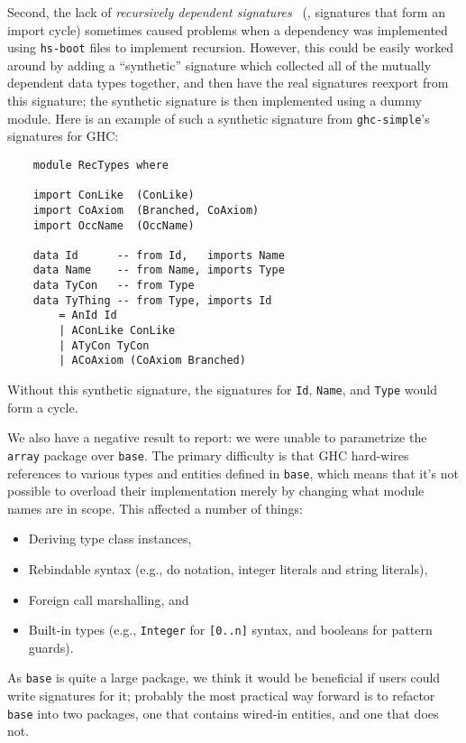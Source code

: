 Second, the lack of
\emph{recursively dependent signatures}~\cite{crary+:recmod-pldi}
(\ie, signatures that form an import cycle)
sometimes caused problems when a
dependency was implemented using \texttt{hs-boot} files to implement
recursion.  However, this could be easily worked around by adding
a ``synthetic'' signature which collected all of the mutually dependent
data types together, and then have the real signatures reexport
from this signature;  the synthetic signature is then implemented using
a dummy module.  Here is an example of such a synthetic signature
from \texttt{ghc-simple}'s signatures for GHC\@:

\begin{verbatim}
    module RecTypes where

    import ConLike  (ConLike)
    import CoAxiom  (Branched, CoAxiom)
    import OccName  (OccName)

    data Id      -- from Id,   imports Name
    data Name    -- from Name, imports Type
    data TyCon   -- from Type
    data TyThing -- from Type, imports Id
        = AnId Id
        | AConLike ConLike
        | ATyCon TyCon
        | ACoAxiom (CoAxiom Branched)
\end{verbatim}
Without this synthetic signature, the signatures for \texttt{Id}, \texttt{Name},
and \texttt{Type} would form a cycle.

We also have a negative result to report: we were unable to parametrize
the \verb|array| package over \verb|base|.  The primary difficulty is
that GHC hard-wires references to various types and entities defined in
\verb|base|, which means that it's not possible to overload their
implementation merely by changing what module names are in scope.  This
affected a number of things:

\begin{itemize}
    \item Deriving type class instances,
    \item Rebindable syntax (e.g., do notation, integer literals
          and string literals),
    \item Foreign call marshalling, and
    \item Built-in types (e.g., \verb|Integer| for \verb|[0..n]|
          syntax, and booleans for pattern guards).
\end{itemize}
%
As \verb|base| is quite a large package, we think it would be beneficial
if users could write signatures for it; probably the most practical
way forward is to refactor \verb|base| into two packages, one that
contains wired-in entities, and one that does not.

